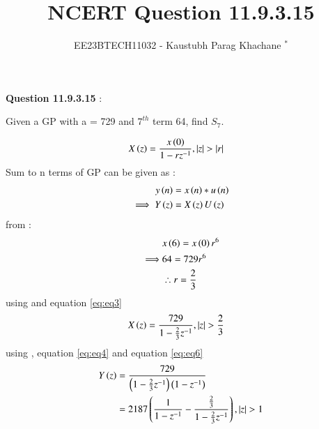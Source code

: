 \documentclass[journal,12pt,twocolumn]{IEEEtran}
\theoremstyle{remark}
\begin{document}

\vspace{3cm}

\Large\title{NCERT Question 11.9.3.15}
\large\author{EE23BTECH11032 - Kaustubh Parag Khachane $^{*}$%
}
\maketitle
\newpage
\bigskip

\renewcommand{\thefigure}{\theenumi}
\renewcommand{\thetable}{\theenumi}
\large\textbf{Question 11.9.3.15} :

Given a GP with a = 729 and $7^{th}$ term 64, find $S_7$.

\solution


\begin{align}
   & X\left(z\right) = \frac{x\left(0\right)}{1 - rz^{-1}} , \left\vert z\right\vert > \left\vert r\right\vert\label{eq:eq3}
\end{align}
 Sum to n terms of GP can be given as :
\begin{align}
    y\left(n\right) &= x\left(n\right)*u\left(n\right)\\
    \implies  Y\left(z\right) &= X\left(z\right)U\left(z\right)\label{eq:eq4}
\end{align}
from  :
\begin{align}
    &x\left(6\right) = x\left(0\right)r^6\\
    \implies &64 = 729r^6\\
    &\therefore r = \frac{2}{3}\label{eq:eq2}
\end{align}
using  and equation \eqref{eq:eq3}
\begin{align}
    &X\left(z\right) = \frac{729}{1 - \frac{2}{3}z^{-1}}\label{eq:eq6},\left\vert z\right\vert > \frac{2}{3}
\end{align}
using , equation \eqref{eq:eq4} and equation \eqref{eq:eq6}
\begin{align}
    Y\left(z\right) &= \frac{729}{\left(1 - \frac{2}{3}z^{-1}\right)\left(1-z^{-1}\right)}\\
    &= 2187\left(\frac{1}{1-z^{-1}} - \frac{\frac{2}{3}}{1 - \frac{2}{3}z^{-1}}\right) \label{eq:eq5},\left\vert z\right\vert  > 1
\end{align}
\end{document}
